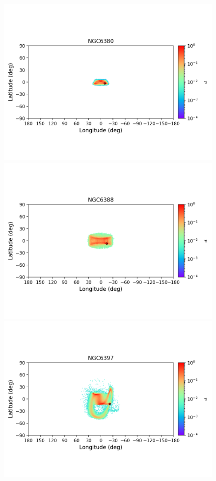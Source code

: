         \begin{figure}
        \includegraphics[clip=true, trim = 0mm 20mm 0mm 10mm, width=1\columnwidth]{images/error_plots_NGC6380.png}
        \includegraphics[clip=true, trim = 0mm 20mm 0mm 10mm, width=1\columnwidth]{images/error_plots_NGC6388.png}
        \includegraphics[clip=true, trim = 0mm 20mm 0mm 10mm, width=1\columnwidth]{images/error_plots_NGC6397.png}

\end{figure}
